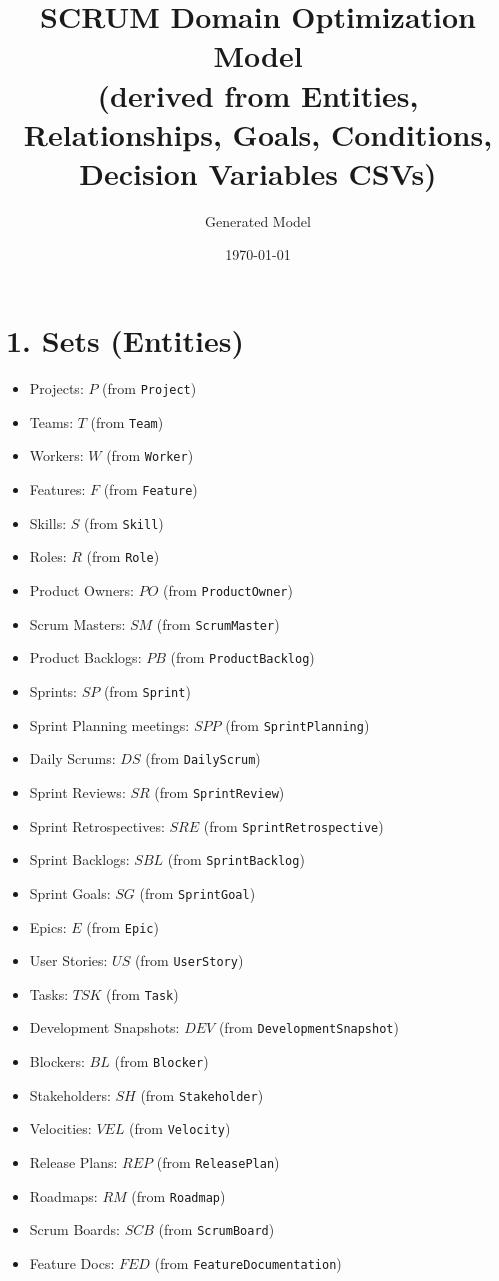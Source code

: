 \documentclass[11pt,a4paper]{article}
\title{SCRUM Domain Optimization Model\\\small(derived from Entities, Relationships, Goals, Conditions, Decision Variables CSVs)}
\author{Generated Model}
\date{\today}
\begin{document}
\maketitle
\tableofcontents
\newpage

\section{1. Sets (Entities)}
\begin{itemize}[leftmargin=2em]
  \item Projects: $P$ (from \texttt{Project})
  \item Teams: $T$ (from \texttt{Team})
  \item Workers: $W$ (from \texttt{Worker}) \quad
  \item Features: $F$ (from \texttt{Feature})
  \item Skills: $S$ (from \texttt{Skill})
  \item Roles: $R$ (from \texttt{Role})
  \item Product Owners: $PO$ (from \texttt{ProductOwner})
  \item Scrum Masters: $SM$ (from \texttt{ScrumMaster})
  \item Product Backlogs: $PB$ (from \texttt{ProductBacklog})
  \item Sprints: $SP$ (from \texttt{Sprint})
  \item Sprint Planning meetings: $SPP$ (from \texttt{SprintPlanning})
  \item Daily Scrums: $DS$ (from \texttt{DailyScrum})
  \item Sprint Reviews: $SR$ (from \texttt{SprintReview})
  \item Sprint Retrospectives: $SRE$ (from \texttt{SprintRetrospective})
  \item Sprint Backlogs: $SBL$ (from \texttt{SprintBacklog})
  \item Sprint Goals: $SG$ (from \texttt{SprintGoal})
  \item Epics: $E$ (from \texttt{Epic})
  \item User Stories: $US$ (from \texttt{UserStory})
  \item Tasks: $TSK$ (from \texttt{Task})
  \item Development Snapshots: $DEV$ (from \texttt{DevelopmentSnapshot})
  \item Blockers: $BL$ (from \texttt{Blocker})
  \item Stakeholders: $SH$ (from \texttt{Stakeholder})
  \item Velocities: $VEL$ (from \texttt{Velocity})
  \item Release Plans: $REP$ (from \texttt{ReleasePlan})
  \item Roadmaps: $RM$ (from \texttt{Roadmap})
  \item Scrum Boards: $SCB$ (from \texttt{ScrumBoard})
  \item Feature Docs: $FED$ (from \texttt{FeatureDocumentation})
\end{itemize}
\end{document}
